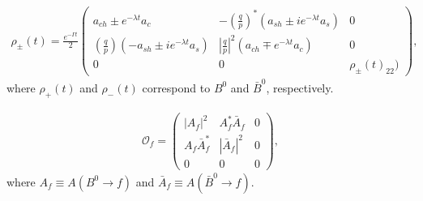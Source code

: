 \begin{align}
\label{eq:density}
\rho_{\pm}(t) = \frac{e^{-\Gamma t}}{2}\begin{pmatrix}
a_{ch} \pm e^{-\lambda t}a_c & -\left(\frac{q}{p}\right)^*\left(a_{sh}\pm ie^{-\lambda t}a_s\right) & 0 \\
\left(\frac{q}{p}\right)\left(-a_{sh} \pm ie^{-\lambda t}a_s \right) & \left|\frac{q}{p}\right|^2 \left(a_{ch}\mp e^{-\lambda t}a_c\right)  & 0 \\
0 & 0 & \rho_{\pm}(t)_{22})
\end{pmatrix},
\end{align}
where $\rho_+(t)$ and $\rho_-(t)$ correspond to $B^0$ and $\bar{B}^0$, respectively.

\begin{align}
\label{eq:observable}
\mathcal{O}_f = 
\begin{pmatrix}
|A_f|^2 & A_f^*\bar{A}_f & 0 \\
A_f\bar{A}_f^* & |\bar{A}_f|^2 & 0 \\
0 & 0 & 0
\end{pmatrix},
\end{align}
where $A_f \equiv A(B^0\rightarrow f)$ and $\bar{A}_f \equiv A(\bar{B}^0\rightarrow f)$.

